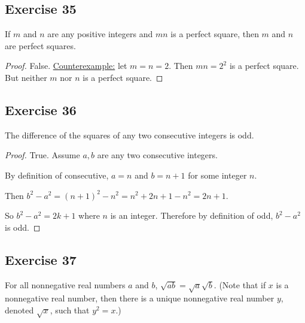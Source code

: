 \documentclass[14pt]{extarticle}
\begin{document}
\subsection{Exercise 35}
If $m$ and $n$ are any positive integers and $mn$ is a perfect square, then $m$ and $n$ are perfect squares. 

\begin{proof}
False. \underline{Counterexample:} let $m = n = 2$. Then $mn = 2^2$ is a perfect square. But neither $m$ nor $n$ is a perfect square.
\end{proof}

\subsection{Exercise 36}
The difference of the squares of any two consecutive integers is odd.

\begin{proof}
True. Assume $a,b$ are any two consecutive integers. 

By definition of consecutive, $a = n$ and $b = n+1$ for some integer $n$.

Then $b^2 - a^2 = (n+1)^2 - n^2 = n^2+2n+1-n^2 = 2n+1$.

So $b^2 - a^2 = 2k+1$ where $n$ is an integer. Therefore by definition of odd, $b^2-a^2$ is odd.
\end{proof}

\subsection{Exercise 37}
For all nonnegative real numbers $a$ and $b$, $\sqrt{ab} = \sqrt{a}\sqrt{b}$. (Note that if $x$ is a nonnegative real number, then there is a unique nonnegative real number $y$, denoted $\sqrt{x}$, such that $y^2 = x$.)
\end{document}
